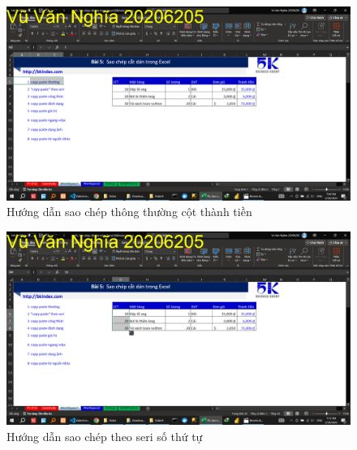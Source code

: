 \documentclass{article}
\begin{document}
\begin{figure}[h]
    \centering
    \includegraphics[scale = 0.15]{Video4/HuongDan/1.png}
    \caption{Hướng dẫn sao chép thông thường cột thành tiền}
\end{figure}
\begin{figure}[h]
    \centering
    \includegraphics[scale = 0.15]{Video4/HuongDan/2.png}
    \caption{Hướng dẫn sao chép theo seri số thứ tự}
\end{figure}








\end{document}
